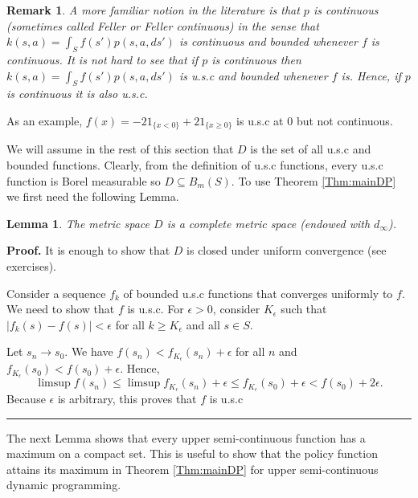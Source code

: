 \documentclass[letter,11pt]{article}
\newtheorem{lemma}{Lemma}[section]
\newtheorem{remark}{Remark}[section]
\newenvironment {proof}[1][Proof]{\noindent \textbf {#1.} }{\ \rule {0.5em}{0.5em}}
\begin{document}
\begin{remark}
     A more familiar notion in the literature is that $p$ is continuous (sometimes called Feller or Feller continuous) in the sense that $k(s,a) = \int _{S} f(s')p(s,a,ds')$ is continuous and bounded whenever $f$ is continuous. It is not hard to see that if $p$ is continuous then $k(s,a) = \int _{S} f(s')p(s,a,ds')$ is u.s.c and bounded whenever $f$ is. Hence, if $p$ is continuous it is also u.s.c. 
\end{remark}


As an example, $f (x) = -2 1_{ \{x < 0 \} } + 2 1_{ \{x \geq 0 \} }$ is u.s.c at $0$ but not continuous. 

We will assume in the rest of this section that $D$ is the set of all u.s.c and bounded functions. 
Clearly, from the definition of u.s.c functions, every u.s.c function is Borel measurable so $D \subseteq B_{m}(S)$. To use Theorem \ref{Thm:mainDP} we first need the following Lemma. 

\begin{lemma} \label{Lem:complete}
    The metric space $D$ is a complete metric space (endowed with $d_{\infty}$). 
\end{lemma}

\begin{proof}
    It is enough to show that $D$ is closed under uniform convergence (see exercises). 

    Consider a sequence $f_{k}$ of bounded u.s.c functions that converges uniformly to $f$. We need to show that $f$ is u.s.c.   
    For $\epsilon >0$, consider $K_{\epsilon} $ such that $|f_{k}(s) - f(s)| < \epsilon$ for all $k \geq K_{\epsilon}$ and all $s \in S$. 

    Let $s_{n} \rightarrow s_{0}$. We have $f(s_{n}) < f_{K_{\epsilon} }(s_{n}) + \epsilon$ for all $n$ and $ f_{K_{\epsilon} } (s_{0} ) < f(s_{0}) + \epsilon$. Hence, 
    $$ \limsup f(s_{n}) \leq  \limsup f_{K_{\epsilon} } (s_{n}) + \epsilon \leq  f_{K_{\epsilon} } (s_{0}) + \epsilon < f(s_{0}) + 2\epsilon. $$
Because $\epsilon$ is arbitrary, this proves that $f$ is u.s.c 
\end{proof}

The next Lemma shows that every upper semi-continuous function has a maximum on a compact set. This is useful to show that the policy function attains its maximum in Theorem \ref{Thm:mainDP} for upper semi-continuous dynamic programming. 
\end{document}
